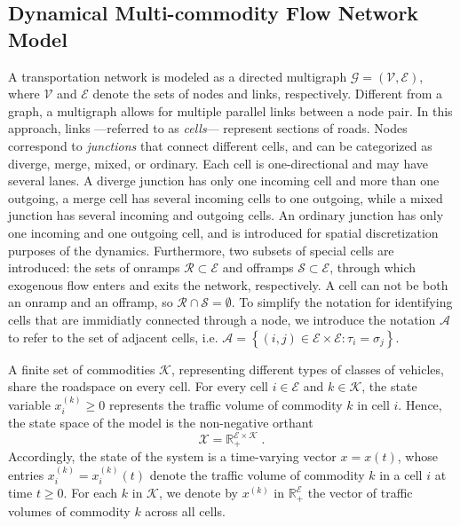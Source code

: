 \documentclass[preprint,12pt]{elsarticle}
\newcommand{\be}{\begin{equation}}
\newcommand{\ee}{\end{equation}}
\newcommand{\mc}{\mathcal}
\newcommand{\R}{\mathbb{R}}
\begin{document}
\subsection{Dynamical Multi-commodity Flow Network Model}
A transportation network is modeled as a directed multigraph $\mc{G} = (\mc{V},\mc{E})$, where $\mc{V}$ and $\mc{E}$ denote the sets of nodes and links, respectively. Different from a graph, a multigraph allows for multiple parallel links between a node pair. In this approach, links ---referred to as \textit{cells}--- represent sections of roads. Nodes correspond to \textit{junctions} that connect different cells, and can be categorized as diverge, merge, mixed, or ordinary.  Each cell is one-directional and may have several lanes. A diverge junction has only one incoming cell and more than one outgoing, a merge cell has several incoming cells to one outgoing, while a mixed junction has several incoming and outgoing cells. An ordinary junction has only one incoming and one outgoing cell, and is introduced for spatial discretization purposes of the dynamics. Furthermore, two subsets of special cells are introduced: the sets of onramps $\mc{R} \subset \mc{E}$ and offramps $\mc{S} \subset \mc{E}$, through which exogenous flow enters and exits the network, respectively. A cell can not be both an onramp and an offramp, so $\mc{R} \cap \mc{S} = \emptyset$. To simplify the notation for identifying cells that are immidiatly connected through a node, we introduce the notation $\mc{A}$ to refer to the set of adjacent cells, i.e. $\mc{A} = \left\{(i,j) \in \mc{E} \times \mc{E} : \tau_i = \sigma_j\right\}$. 

A finite set of commodities $\mc{K}$, representing different types of classes of vehicles, share the roadspace on every cell. For every cell $i \in \mc{E}$ and $k \in \mc{K}$, the state variable $x_i^{(k)} \geq 0$ represents the traffic volume of commodity $k$ in cell $i$. Hence, the state space of the model is the non-negative orthant
\be\label{eq:statespace}
\mc{X} = \R^{\mc{E}\times\mc{K}}_+ \;.
\ee
Accordingly, the state of the system is a time-varying vector $x = x(t)$, whose entries $x_i^{(k)} = x_i^{(k)}(t)$ denote the traffic volume of commodity $k$ in a cell $i$ at time $t \geq 0$. For each $k$ in $\mc{K}$, we denote by $x^{(k)}$ in $\R_+^{\mc E}$ the vector of traffic volumes of commodity $k$ across all cells.
\end{document}
